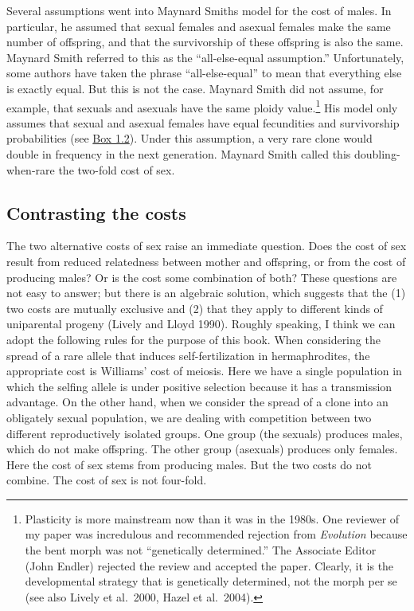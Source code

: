 \documentclass[
  letterpaper,
]{book}
\begin{document}
Several assumptions went into Maynard Smith\textquotesingle s model for
the cost of males. In particular, he assumed that sexual females and
asexual females make the same number of offspring, and that the
survivorship of these offspring is also the same. Maynard Smith referred
to this as the ``all-else-equal assumption.'' Unfortunately, some
authors have taken the phrase ``all-else-equal'' to mean that everything
else is exactly equal. But this is not the case. Maynard Smith did not
assume, for example, that sexuals and asexuals have the same ploidy
value.\footnote{Plasticity is more mainstream now than it was in the
  1980s. One reviewer of my paper was incredulous and recommended
  rejection from \emph{Evolution} because the bent morph was not
  ``genetically determined.'' The Associate Editor (John Endler)
  rejected the review and accepted the paper. Clearly, it is the
  developmental strategy that is genetically determined, not the morph
  per se (see also Lively et al.~2000, Hazel et al.~2004).} His model
only assumes that sexual and asexual females have equal fecundities and
survivorship probabilities (see \protect\hyperlink{callout-2}{Box 1.2}).
Under this assumption, a very rare clone would double in frequency in
the next generation. Maynard Smith called this doubling-when-rare the
two-fold cost of sex.

\hypertarget{contrasting-the-costs}{%
\subsection{Contrasting the costs}\label{contrasting-the-costs}}

The two alternative costs of sex raise an immediate question. Does the
cost of sex result from reduced relatedness between mother and
offspring, or from the cost of producing males? Or is the cost some
combination of both? These questions are not easy to answer; but there
is an algebraic solution, which suggests that the (1) two costs are
mutually exclusive and (2) that they apply to different kinds of
uniparental progeny (Lively and Lloyd 1990). Roughly speaking, I think
we can adopt the following rules for the purpose of this book. When
considering the spread of a rare allele that induces self-fertilization
in hermaphrodites, the appropriate cost is Williams' cost of meiosis.
Here we have a single population in which the selfing allele is under
positive selection because it has a transmission advantage. On the other
hand, when we consider the spread of a clone into an obligately sexual
population, we are dealing with competition between two different
reproductively isolated groups. One group (the sexuals) produces males,
which do not make offspring. The other group (asexuals) produces only
females. Here the cost of sex stems from producing males. But the two
costs do not combine. The cost of sex is not four-fold.
\end{document}
